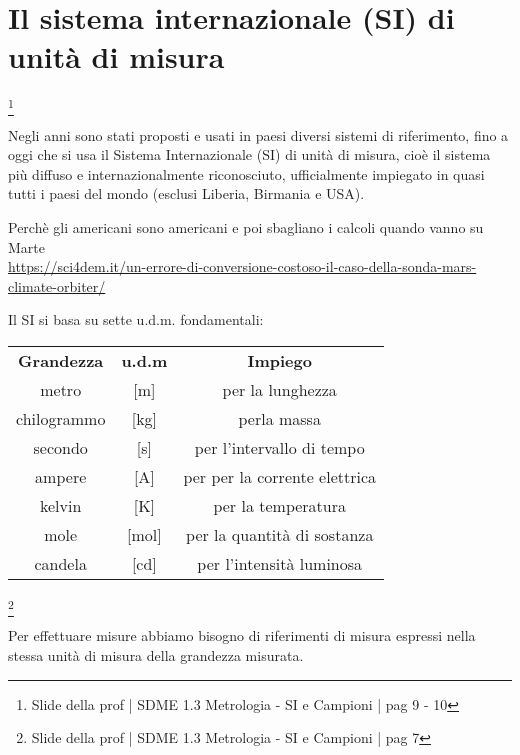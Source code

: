 \newpage 

\section{Il sistema internazionale (SI) di unità di misura} 
\footnote{Slide della prof | SDME 1.3 Metrologia - SI e Campioni | pag 9 - 10}

Negli anni sono stati proposti e usati in paesi diversi sistemi di riferimento, fino a oggi che si usa il Sistema Internazionale (SI) di unità di misura, 
cioè il sistema più diffuso e internazionalmente riconosciuto, ufficialmente impiegato in quasi tutti i paesi del mondo (esclusi Liberia, Birmania e USA). \newline 

\begin{tcolorbox}
    Perchè gli americani sono americani e poi sbagliano i calcoli quando vanno su Marte \\
    \url{https://sci4dem.it/un-errore-di-conversione-costoso-il-caso-della-sonda-mars-climate-orbiter/}
\end{tcolorbox}

Il SI si basa su sette u.d.m. fondamentali: 

{
\Large 
\begin{center}
    \begin{tabular}{c  c  c}
        \textbf{Grandezza} & \textbf{u.d.m} & \textbf{Impiego} \\ 
        metro & [m] & per la lunghezza \\
        chilogrammo & [kg] & perla massa \\ 
        secondo & [s] & per l'intervallo di tempo \\
        ampere & [A] & per per la corrente elettrica \\
        kelvin & [K] & per la temperatura \\ 
        mole & [mol] & per la quantità di sostanza \\ 
        candela & [cd] & per l'intensità luminosa
    \end{tabular}        
\end{center}

}

\newpage 

\footnote{Slide della prof | SDME 1.3 Metrologia - SI e Campioni | pag 7}

Per effettuare misure abbiamo bisogno di riferimenti di misura espressi nella stessa unità di misura della grandezza misurata. \newline 

